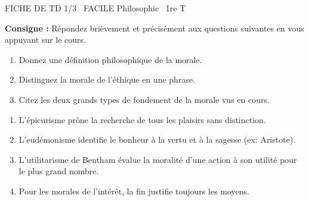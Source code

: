 \documentclass[11pt]{article}
\begin{document}
\begin{tcolorbox}[enhanced,colback=popink,colframe=popink,arc=10pt,boxrule=0pt,left=12pt,right=12pt,top=9pt,bottom=9pt]
{\color{white}\popxbold\small FICHE DE TD 1/3 \textbullet\ FACILE \hfill Philosophie \textbullet\ 1re T\par}
\end{tcolorbox}
\vspace{4pt}
\noindent \textbf{Consigne :} Répondez brièvement et précisément aux questions suivantes en vous appuyant sur le cours.

\begin{exercice}
\begin{enumerate}
    \item Donnez une définition philosophique de la morale.
    \item Distinguez la morale de l'éthique en une phrase.
    \item Citez les deux grands types de fondement de la morale vus en cours.
\end{enumerate}
\end{exercice}

\begin{exercice}
\begin{enumerate}
    \item L'épicurisme prône la recherche de tous les plaisirs sans distinction.
    \item L'eudémonisme identifie le bonheur à la vertu et à la sagesse (ex: Aristote).
    \item L'utilitarisme de Bentham évalue la moralité d'une action à son utilité pour le plus grand nombre.
    \item Pour les morales de l'intérêt, la fin justifie toujours les moyens.
\end{enumerate}
\end{exercice}
\end{document}
